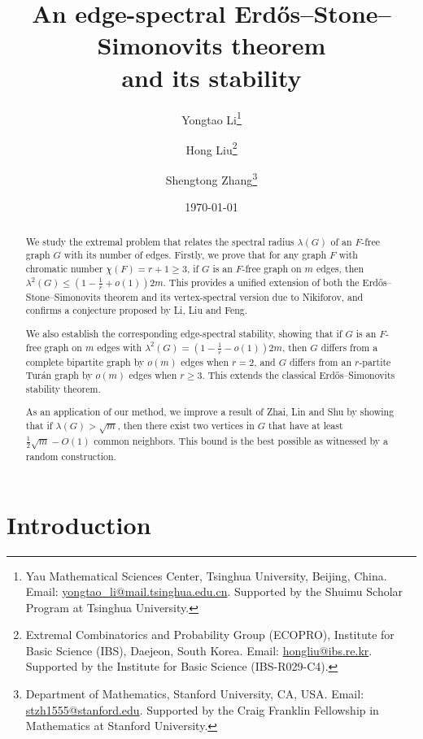 \documentclass[11pt,a4paper]{article}
\title{An edge-spectral Erd\H{o}s--Stone--Simonovits theorem\\ and its stability}
\author{
Yongtao Li\thanks{Yau Mathematical Sciences Center, Tsinghua University, Beijing, China. Email: 
\url{yongtao_li@mail.tsinghua.edu.cn}. Supported by the Shuimu Scholar Program at Tsinghua University.} 
\and
Hong Liu\thanks{Extremal Combinatorics and Probability Group (ECOPRO), Institute for Basic Science (IBS), Daejeon, South Korea. Email: \url{hongliu@ibs.re.kr}. Supported by the Institute for Basic Science (IBS-R029-C4).}
\and
Shengtong Zhang\thanks{Department of Mathematics, Stanford University, CA, USA. Email: \url{stzh1555@stanford.edu}. Supported by the Craig Franklin Fellowship in Mathematics at Stanford University.}
}
\date{\today}
\theoremstyle{definition}
\theoremstyle{remark}
\begin{document}
\maketitle


\begin{abstract}
We study the extremal problem that relates the spectral radius $\lambda (G)$ of an $F$-free graph $G$ with its number of edges. 
Firstly, we prove that for any graph $F$ with chromatic number $\chi (F)=r+1\ge 3$, if $G$ is an $F$-free graph on $m$ edges, then $\lambda^2(G)\le {(1-\frac{1}{r} + o(1))2m}$. 
This provides a unified extension of both the Erd\H{o}s--Stone--Simonovits theorem and its vertex-spectral version due to Nikiforov, and confirms a conjecture proposed by Li, Liu and Feng.

We also establish the corresponding edge-spectral stability, showing that if $G$ is an $F$-free graph on $m$ edges with   $\lambda^2(G)=(1- \frac{1}{r} - o(1))2m$, then $G$ differs from a complete bipartite graph by $o(m)$ edges when $r=2$, and $G$ differs from an $r$-partite Tur\'{a}n graph by $o(m)$ edges when $r\ge 3$. 
This extends the classical Erd\H{o}s--Simonovits stability theorem. 

As an application of our method, we improve a result of Zhai, Lin and Shu by showing that if $\lambda (G)>\sqrt{m}$, then there exist two vertices in $G$ that have at least $\frac{1}{2}\sqrt{m} - O(1)$ common neighbors. This bound is the best possible as witnessed by a random construction. 
\end{abstract}









\section{Introduction}
\end{document}
